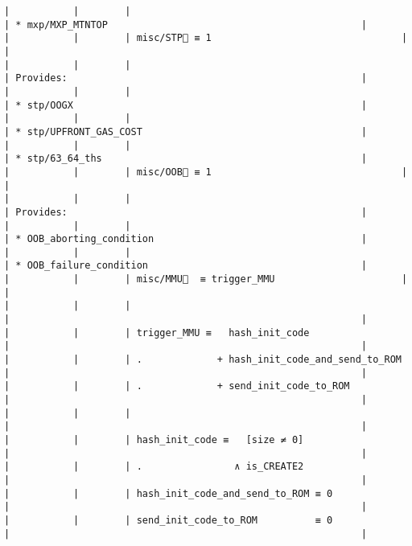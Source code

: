\documentclass[varwidth=\maxdimen,margin=0.5cm,multi={verbatim}]{standalone}
\begin{document}
\begin{verbatim}
|           |        |                                                | * mxp/MXP_MTNTOP                                            |
|           |        | misc/STP🚩 ≡ 1                                 |                                                             |
|           |        |                                                | Provides:                                                   |
|           |        |                                                | * stp/OOGX                                                  |
|           |        |                                                | * stp/UPFRONT_GAS_COST                                      |
|           |        |                                                | * stp/63_64_ths                                             |
|           |        | misc/OOB🚩 ≡ 1                                 |                                                             |
|           |        |                                                | Provides:                                                   |
|           |        |                                                | * OOB_aborting_condition                                    |
|           |        |                                                | * OOB_failure_condition                                     |
|           |        | misc/MMU🚩  ≡ trigger_MMU                      |                                                             |
|           |        |                                                |                                                             |
|           |        | trigger_MMU ≡   hash_init_code                 |                                                             |
|           |        | .             + hash_init_code_and_send_to_ROM |                                                             |
|           |        | .             + send_init_code_to_ROM          |                                                             |
|           |        |                                                |                                                             |
|           |        | hash_init_code ≡   [size ≠ 0]                  |                                                             |
|           |        | .                ∧ is_CREATE2                  |                                                             |
|           |        | hash_init_code_and_send_to_ROM ≡ 0             |                                                             |
|           |        | send_init_code_to_ROM          ≡ 0             |                                                             |

\end{verbatim}
\end{document}
